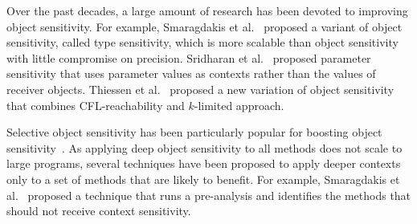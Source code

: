Over the past decades, a large amount of  research
 has been devoted to improving object sensitivity.
For example, Smaragdakis et al.~\cite{Smaragdakis2011} proposed a variant of object sensitivity, called type sensitivity, which is more scalable than object sensitivity with little compromise on precision.
Sridharan et al.~\cite{SridharanDCST12} proposed parameter sensitivity that uses parameter values as contexts rather than the values of receiver objects.
Thiessen et al.~\cite{Thiessen2017} proposed a new variation of object sensitivity
that combines CFL-reachability and $k$-limited approach. 


Selective object sensitivity has been particularly popular for boosting object 
sensitivity~\cite{Smaragdakis2014,Li2018a,Li2018b,JeJeChOh17,WeiR15,Liang2011,Liang2011learning,Lu:2019:PYF}.  As 
applying deep object sensitivity to
all methods does not scale to large programs, several techniques have
been proposed to apply deeper contexts only to a set of methods
that are likely to benefit.
For example, Smaragdakis et al.~\cite{Smaragdakis2014} proposed a technique that runs a
pre-analysis and identifies the methods that should not receive
context sensitivity. 







